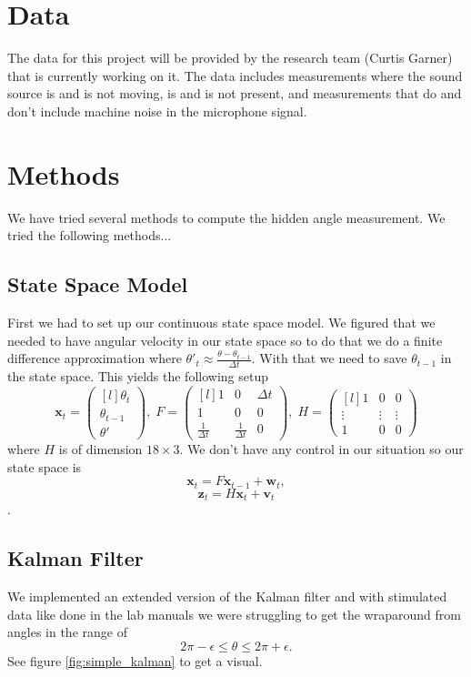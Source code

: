 \documentclass[11pt]{amsart}
\begin{document}
\section{Data}
The data for this project will be provided by the research team (Curtis Garner) that is currently working on it. The data includes measurements where the sound 
source is and is not moving, is and is not present, and measurements that do and don’t include machine noise in the microphone signal.




\section{Methods}
We have tried several methods to compute the hidden angle measurement. We tried the following methods...

\subsection{State Space Model}
First we had to set up our continuous state space model. We figured that we needed to have angular velocity 
in our state space so to do that we do a finite difference approximation where $\theta'_t \approx \frac{\theta - \theta_{t-1}}{\Delta t}$.
With that we need to save $\theta_{t-1}$ in the state space. This yields the following setup
\[\mathbf{x}_t = \begin{pmatrix*}[l]
    \theta_t \\
    \theta_{t-1} \\
    \theta'
\end{pmatrix*},\;  
F = \begin{pmatrix*}[l]
    1 & 0 & \Delta t \\
    1 & 0 & 0 \\
    \frac{1}{\Delta t} & \frac{1}{\Delta t} & 0
\end{pmatrix*},\;
H = \begin{pmatrix*}[l]
    1 & 0 & 0 \\
    \vdots & \vdots & \vdots\\
    1 & 0 & 0

\end{pmatrix*}\]
 where $H$ is of dimension $18\times3$. We don't have any control in our situation so our state space is
 \[\mathbf{x}_t = F\mathbf{x}_{t-1} + \mathbf{w}_t,\]
\[\mathbf{z}_t = H\mathbf{x}_t + \mathbf{v}_t\].

\subsection{Kalman Filter}
We implemented an extended version of the Kalman filter \cite{V3} and with stimulated data like done in the lab manuals we were struggling 
to get the wraparound from angles in the range of \[2\pi - \epsilon \leq \theta \leq 2\pi + \epsilon.\] See figure \ref{fig:simple_kalman}
to get a visual.
\end{document}
